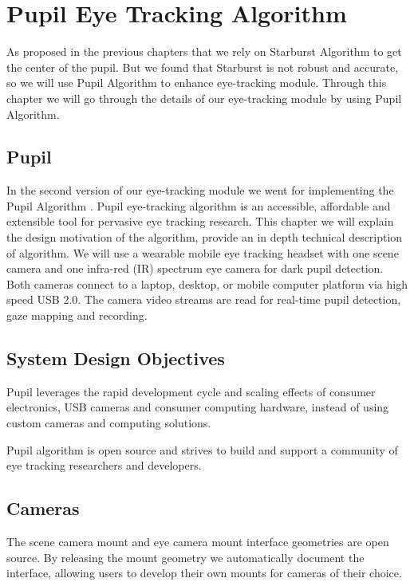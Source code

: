 \chapter{Pupil Eye Tracking Algorithm}
As proposed in the previous chapters that we rely on Starburst \cite{starburst} Algorithm to get the center of the pupil. But we found that Starburst is not robust and accurate, so we will use Pupil Algorithm to enhance eye-tracking module. Through this chapter we will go through the details of our eye-tracking module by using Pupil Algorithm.

\section{Pupil}
In the second version of our eye-tracking module we went for implementing the Pupil Algorithm \cite{pupil}. Pupil eye-tracking algorithm is an accessible, affordable and extensible tool for pervasive eye tracking research. This chapter we will explain the design motivation of the algorithm, provide an in depth technical description of algorithm. We will use a wearable mobile eye tracking headset with one 
scene camera and one infra-red (IR) spectrum eye camera for dark pupil detection. Both cameras connect to a laptop, desktop, or mobile computer platform via high speed USB 2.0. The camera video streams are read for real-time pupil detection, gaze mapping and recording.  


\section{System Design Objectives}
	Pupil leverages the rapid development cycle and scaling effects of consumer electronics, USB cameras and consumer computing hardware, instead of using custom cameras and computing solutions. \bigskip

Pupil algorithm is open source and strives to build and support a community of eye tracking researchers and developers.

\section{Cameras} 
The scene camera mount and eye camera mount interface geometries are open source. By releasing the mount geometry we automatically document the interface, allowing users to develop their own mounts for cameras of their choice. \bigskip

